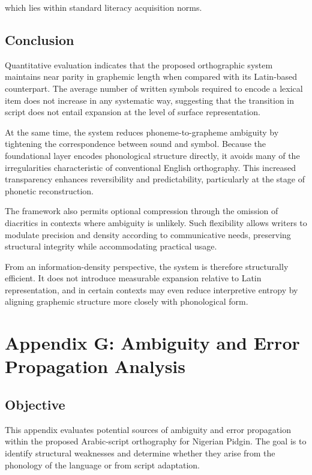 \documentclass[12pt]{article}
\begin{document}
which lies within standard literacy acquisition norms.

\subsection{Conclusion}

Quantitative evaluation indicates that the proposed orthographic system maintains near parity in graphemic length when compared with its Latin-based counterpart. The average number of written symbols required to encode a lexical item does not increase in any systematic way, suggesting that the transition in script does not entail expansion at the level of surface representation.

At the same time, the system reduces phoneme-to-grapheme ambiguity by tightening the correspondence between sound and symbol. Because the foundational layer encodes phonological structure directly, it avoids many of the irregularities characteristic of conventional English orthography. This increased transparency enhances reversibility and predictability, particularly at the stage of phonetic reconstruction.

The framework also permits optional compression through the omission of diacritics in contexts where ambiguity is unlikely. Such flexibility allows writers to modulate precision and density according to communicative needs, preserving structural integrity while accommodating practical usage.

From an information-density perspective, the system is therefore structurally efficient. It does not introduce measurable expansion relative to Latin representation, and in certain contexts may even reduce interpretive entropy by aligning graphemic structure more closely with phonological form.

\section{Appendix G: Ambiguity and Error Propagation Analysis}

\subsection{Objective}

This appendix evaluates potential sources of ambiguity and error propagation within the proposed Arabic-script orthography for Nigerian Pidgin. The goal is to identify structural weaknesses and determine whether they arise from the phonology of the language or from script adaptation.
\end{document}

